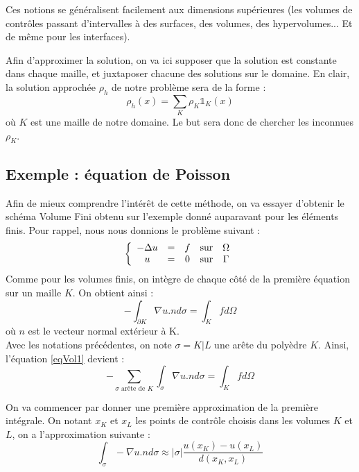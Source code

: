 Ces notions se généralisent facilement aux dimensions supérieures (les volumes de contrôles passant d'intervalles à des surfaces, des volumes, des hypervolumes... Et de même pour les interfaces).

\bigskip
Afin d'approximer la solution, on va ici supposer que la solution est constante dans chaque maille, et juxtaposer chacune des solutions sur le domaine. En clair, la solution approchée $\rho_h$ de notre problème sera de la forme :
	\[\rho_h(x)=\sum_K \rho_K \mathbb{1}_K(x)\]
où $K$ est une maille de notre domaine. Le but sera donc de chercher les inconnues $\rho_K$. 

	\subsection{Exemple : équation de Poisson}
Afin de mieux comprendre l'intérêt de cette méthode, on va essayer d'obtenir le schéma Volume Fini obtenu sur l'exemple donné auparavant pour les éléments finis. Pour rappel, nous nous donnions le problème suivant :
\[\left\{\begin{array}{c c c c c}
	-\Delta u &=& f &\text{sur} & \Omega\\
	u &=& 0 &\text{sur}& \Gamma
\end{array}\right.\]
Comme pour les volumes finis, on intègre de chaque côté de la première équation sur un maille $K$. On obtient ainsi :
\begin{equation}\label{eqVol1}
	-\int_{\partial K} \nabla u.n d\sigma = \int_K f d\Omega
\end{equation}
où $n$ est le vecteur normal extérieur à K. \\
Avec les notations précédentes, on note $\sigma=K|L$ une arête du polyèdre $K$. Ainsi, l'équation \ref{eqVol1} devient :
\begin{equation}\label{eqVol2}
	-\sum_{\sigma \text{ arête de } K} \int_{\sigma} \nabla u.n d\sigma = \int_K f d\Omega
\end{equation}

On va commencer par donner une première approximation de la première intégrale. On notant $x_K$ et $x_L$ les points de contrôle choisis dans les volumes $K$ et $L$, on a l'approximation suivante :
	\[\int_{\sigma} -\nabla u .n d\sigma \approx |\sigma| \frac{u(x_K)-u(x_L)}{d(x_K,x_L)}\]


